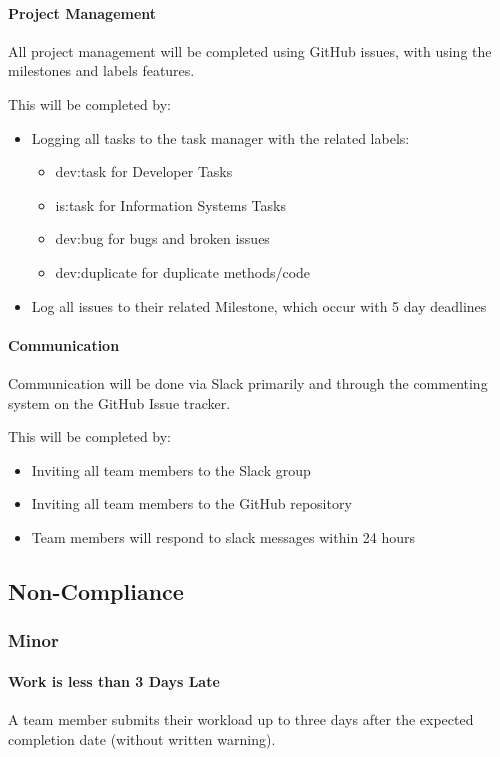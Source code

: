 \documentclass[12pt, a4paper, onecolumn]{article}
\begin{document}
\paragraph{Project Management}
All project management will be completed using GitHub issues, with
using the milestones and labels features.

This will be completed by:
\begin{itemize}
  \setlength\itemsep{1px}
  \item Logging all tasks to the task manager with the related labels:
  \begin{itemize}
    \setlength\itemsep{1px}
    \item dev:task for Developer Tasks
    \item is:task for Information Systems Tasks
    \item dev:bug for bugs and broken issues
    \item dev:duplicate for duplicate methods/code
  \end{itemize}
  \item Log all issues to their related Milestone, which occur
  with 5 day deadlines
\end{itemize}

\paragraph{Communication}
Communication will be done via Slack primarily and through the
commenting system on the GitHub Issue tracker.

This will be completed by:
\begin{itemize}
  \setlength\itemsep{1px}
  \item Inviting all team members to the Slack group
  \item Inviting all team members to the GitHub repository
  \item Team members will respond to slack messages within 24 hours
\end{itemize}

\subsection{Non-Compliance}
\subsubsection{Minor}
\paragraph{Work is less than 3 Days Late}
A team member submits their workload up to three days after the
expected completion date (without written warning).
\end{document}

